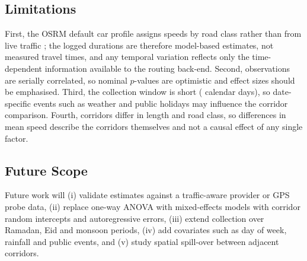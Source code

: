 \documentclass[conference]{IEEEtran}
\begin{document}
\subsection{Limitations}
First, the OSRM default car profile assigns speeds by road class rather than from live traffic \cite{ghosh2020eco}; the logged durations are therefore model-based estimates, not measured travel times, and any temporal variation reflects only the time-dependent information available to the routing back-end. Second, observations are serially correlated, so nominal $p$-values are optimistic and effect sizes should be emphasised. Third, the collection window is short (\NDays{} calendar days), so date-specific events such as weather and public holidays may influence the corridor comparison. Fourth, corridors differ in length and road class, so differences in mean speed describe the corridors themselves and not a causal effect of any single factor.

\subsection{Future Scope}
Future work will (i) validate estimates against a traffic-aware provider or GPS probe data, (ii) replace one-way ANOVA with mixed-effects models with corridor random intercepts and autoregressive errors, (iii) extend collection over Ramadan, Eid and monsoon periods, (iv) add covariates such as day of week, rainfall and public events, and (v) study spatial spill-over between adjacent corridors.



\end{document}
